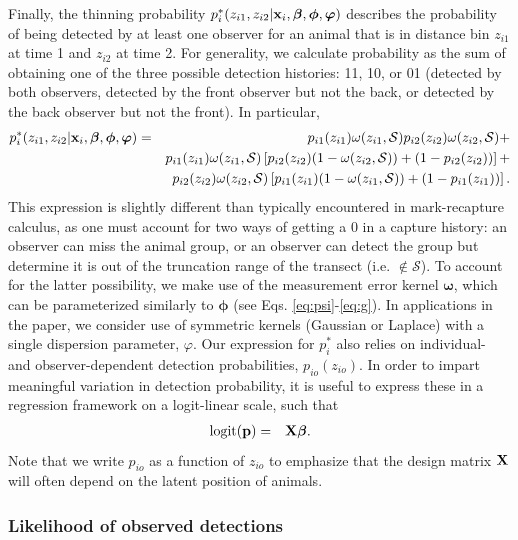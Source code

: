 \documentclass[12pt,fleqn]{article}
\begin{document}
Finally, the thinning probability
$p_i^*(z_{i1},z_{i2}|{\bf x}_i,\boldsymbol{\beta},\boldsymbol{\phi},\boldsymbol{\varphi})$ describes the probability of being detected by at least one observer for an animal that is in distance bin $z_{i1}$ at time 1 and $z_{i2}$ at time 2. For generality, we calculate probability as the sum of obtaining one of the three possible detection histories: 11, 10, or 01 (detected by both observers, detected by the front observer but not the back, or detected by the back observer but not the front).  In particular,
\begin{eqnarray}
  \label{eq:pstar}
  p_i^*(z_{i1},z_{i2}|{\bf x}_i,\boldsymbol{\beta},\boldsymbol{\phi},\boldsymbol{\varphi}) & = &
  p_{i1}(z_{i1}) \omega(z_{i1},\mathcal{S}) p_{i2}(z_{i2})
  \omega(z_{i2},\mathcal{S}) + \\
   & & p_{i1}(z_{i1})\omega(z_{i1},\mathcal{S}) \left[
   p_{i2}(z_{i2})(1-\omega(z_{i2},\mathcal{S}))+(1-p_{i2}(z_{i2})) \right] + \nonumber \\
   & & p_{i2}(z_{i2})\omega(z_{i2},\mathcal{S}) \left[
   p_{i1}(z_{i1})(1-\omega(z_{i1},\mathcal{S}))+(1-p_{i1}(z_{i1})) \right]. \nonumber
\end{eqnarray}
This expression is slightly different than typically encountered in mark-recapture calculus, as one must account for two ways of getting a 0 in a capture history: an observer can miss the animal group, or an observer can detect the group but determine it is out of the truncation range of the transect (i.e. $\notin \mathcal{S}$).  To account for the latter possibility, we make use of the measurement error kernel $\boldsymbol{\omega}$, which can be parameterized similarly to $\boldsymbol{\phi}$ (see Eqs. \ref{eq:psi}-\ref{eq:g}).  In applications in the paper, we consider use of symmetric kernels (Gaussian or Laplace) with a single dispersion parameter, $\varphi$.  Our expression for $p_i^*$ also relies on individual- and observer-dependent detection probabilities, $p_{io}(z_{io})$.  In order to impart meaningful variation in detection probability, it is useful to express these in a regression framework on a logit-linear scale, such that
\begin{eqnarray}
  \textrm{logit}({\bf p}) & = & {\bf X} \boldsymbol{\beta}.
  \label{eq:p}
\end{eqnarray}
Note that we write $p_{io}$ as a function of $z_{io}$ to emphasize that the design matrix ${\bf X}$ will often depend on the latent position of animals.

\subsubsection{Likelihood of observed detections}
\end{document}

